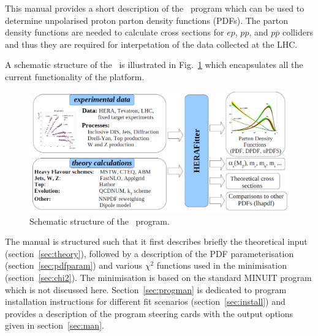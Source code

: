 \label{section:introduction}
This manual provides a short description of the \fitter\ program 
which can be used to determine unpolarised proton parton density functions 
(PDFs). 
The parton density functions are needed to calculate cross sections
for $ep$, $pp$, and $p\overline{p}$ colliders and thus they are required for interpetation
of the data collected at the LHC.

A schematic structure of the \fitter\ is illustrated in Fig.~\ref{fig:flow} which encapsulates all the current functionality of the platform.
\begin{figure}[!ht]
\begin{center}
\includegraphics[width=0.75\linewidth]{figures/flow.pdf}
\caption{Schematic structure of the \fitter\ program.}
\end{center}
\label{fig:flow}
\end{figure}

The manual is structured such that it first describes briefly the
 theoretical input (section~\ref{sec:theory}), followed by a description of the
PDF parameterisation (section~\ref{sec:pdfparam}) and various $\chi^2$ functions used in the minimisation (section~\ref{sec:chi2}). The minimisation is based on the standard MINUIT program \cite{MINUIT} which is not discussed here.
Section~\ref{sec:progman} is dedicated to program installation instructions for different fit scenarios (section~\ref{sec:install}) and provides a description of the program steering cards with the output options given in section~\ref{sec:man}.
